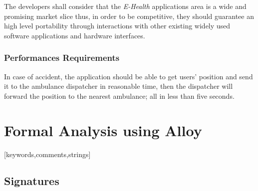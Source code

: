 \documentclass[a4paper]{article}
\begin{document}
        The developers shall consider that the \textit{E-Health} applications area is a wide and promising market slice thus, in order to be competitive, they should guarantee an high level portability through interactions with other existing widely used software applications and hardware interfaces.
        
        \subsubsection{Performances Requirements}
        
        In case of accident, the application should be able to get users' position and send it to the ambulance dispatcher in reasonable time, then the dispatcher will forward the position to the nearest ambulance; all in less than five seconds.
\newpage
\section{Formal Analysis using Alloy}
\renewcommand*{\lstlistlistingname}{Alloy model samples}
\lstlistoflistings
[keywords,comments,strings]
\subsection{Signatures}
    
    
    
    
    
    
\end{document}
